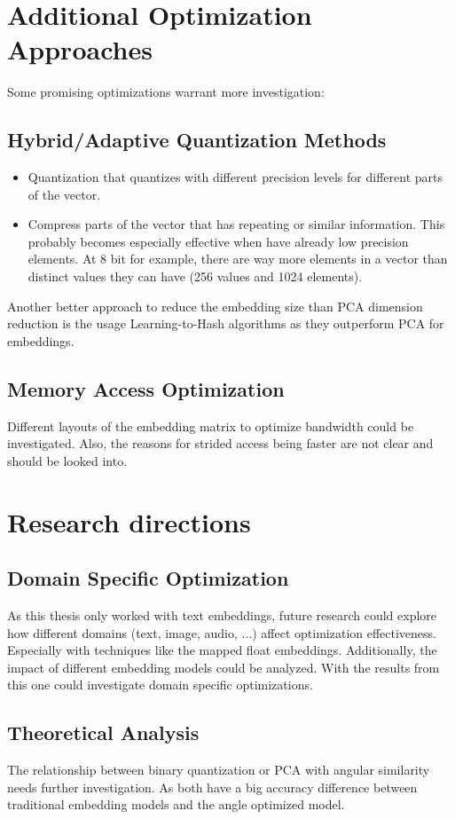 \section{Additional Optimization Approaches}
Some promising optimizations warrant more investigation:
\subsection{Hybrid/Adaptive Quantization Methods}
\begin{itemize}
    \item Quantization that quantizes with different precision levels for different parts of the vector.
    \item Compress parts of the vector that has repeating or similar information. This probably becomes especially effective when have already low precision elements. At 8 bit for example, there are way more elements in a vector than distinct values they can have (256 values and 1024 elements).
\end{itemize}

Another better approach to reduce the embedding size than PCA dimension reduction is the usage Learning-to-Hash algorithms as they outperform PCA for embeddings.~\cite{thakur2023injectingdomainadaptationlearningtohash}

\subsection{Memory Access Optimization}
Different layouts of the embedding matrix to optimize bandwidth could be investigated. Also, the reasons for strided access being faster are not clear and should be looked into.

\section{Research directions}
\subsection{Domain Specific Optimization}
As this thesis only worked with text embeddings, future research could explore how different domains (text, image, audio, ...) affect optimization effectiveness. Especially with techniques like the mapped float embeddings.
Additionally, the impact of different embedding models could be analyzed. With the results from this one could investigate domain specific optimizations.

\subsection{Theoretical Analysis}
The relationship between binary quantization or PCA with angular similarity needs further investigation. As both have a big accuracy difference between traditional embedding models and the angle optimized model.

